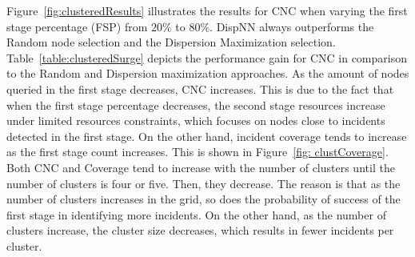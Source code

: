 \documentclass{acm_proc_article-sp}
\begin{document}
Figure~\ref{fig:clusteredResults} illustrates the results for CNC when varying the first stage percentage (FSP) from $20\%$ to $80\%$. DispNN always outperforms the Random node selection and the Dispersion Maximization selection. Table~\ref{table:clusteredSurge} depicts the performance gain for CNC in comparison to the Random and Dispersion maximization approaches. As the amount of nodes queried in the first stage decreases, CNC increases. This is due to the fact that when the first stage percentage decreases, the second stage resources increase under limited resources constraints, which focuses on nodes close to incidents detected in the first stage. On the other hand, incident coverage tends to increase as the first stage count increases. This is shown in Figure~\ref{fig: clustCoverage}. Both CNC and Coverage tend to increase with the number of clusters until the number of clusters is four or five. Then, they decrease. The reason is that as the number of clusters increases in the grid, so does the probability of success of the first stage in identifying more incidents. On the other hand, as the number of clusters increase, the cluster size decreases, which results in fewer incidents per cluster.

\end{document}
